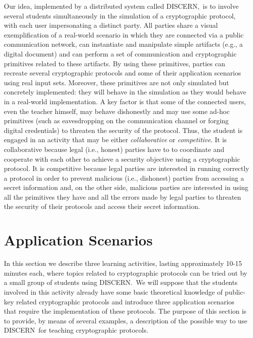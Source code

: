 \documentclass[10pt,conference]{IEEEtran}
\def\disgrace{DISCERN}
\begin{document}
Our idea, implemented by a distributed system called \disgrace,\ is to
involve several students simultaneously in the simulation of a
cryptographic protocol, with each user impersonating a distinct party.
All parties share a visual exemplification of a real-world scenario in
which they are connected via a public communication network, can
instantiate and manipulate simple artifacts (e.g., a digital document)
and can perform a set of communication and cryptographic primitives
related to these artifacts. By using these primitives, parties can
recreate several cryptographic protocols and some of their application
scenarios using real input sets. Moreover, these primitives are not
only simulated but concretely implemented: they will behave in the
simulation as they would behave in a real-world implementation. 
A key factor is that some of the connected users, even the teacher himself, may behave dishonestly and
may use some ad-hoc primitives (such as eavesdropping on the
communication channel or forging digital credentials) to threaten the
security of the protocol. Thus, the student is engaged in an activity
that may be either {\em collaborative} or {\em competitive}. It is
collaborative because legal (i.e., honest) parties have to to
coordinate and cooperate with each other to achieve a security objective using a cryptographic
protocol. It is competitive because legal parties are interested in
running correctly a protocol in order to prevent malicious (i.e.,
dishonest) parties from accessing a secret information and, on the
other side, malicious parties are interested in using all the
primitives they have and all the errors made by legal parties
to threaten the security of their protocols and access their secret information.

\section{Application Scenarios}
\label{sec:application}
In this section we describe three learning activities, lasting
approximately 10-15 minutes each, where topics related to
cryptographic protocols can be tried out by a small group of students
using \disgrace.\ We will suppose that the students involved in this
activity already have some basic theoretical knowledge of public-key
related cryptographic protocols and introduce three application
scenarios that require the implementation of these protocols. The
purpose of this section is to provide, by means of several examples, a
description of the possible way to use \disgrace\ for teaching
cryptographic protocols.
\end{document}

